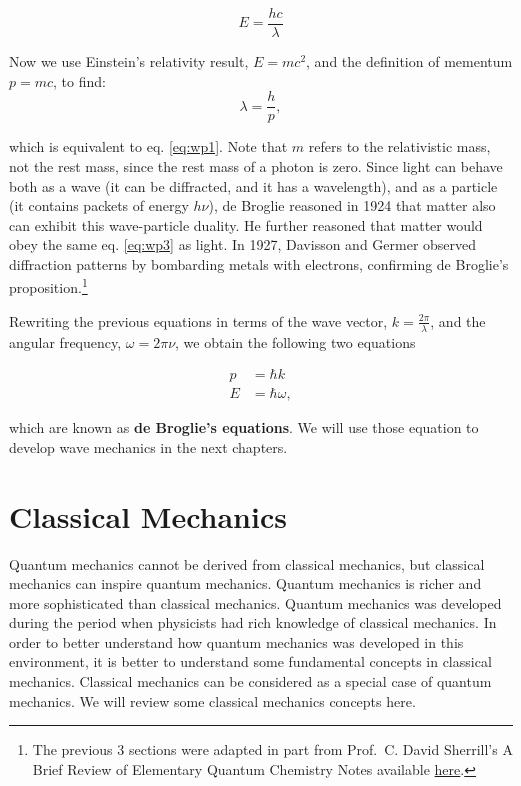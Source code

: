 \documentclass[
  9pt,
]{extbook}
\theoremstyle{definition}
\theoremstyle{definition}
\theoremstyle{definition}
\theoremstyle{remark}
\begin{document}
\begin{equation}
E = \frac{h c}{\lambda}
\label{eq:wp2}
\end{equation}

Now we use Einstein's relativity result, \(E = m c^2\), and the definition of mementum \(p=mc\), to find:
\begin{equation}
\lambda = \frac{h}{p},
\label{eq:wp3}
\end{equation}

which is equivalent to eq. \eqref{eq:wp1}. Note that \(m\) refers to the relativistic mass, not the rest mass, since the rest mass of a photon is zero. Since light can behave both as a wave (it can be diffracted, and it has a wavelength), and as a particle (it contains packets of energy \(h \nu\)), de Broglie reasoned in 1924 that matter also can exhibit this wave-particle duality. He further reasoned that matter would obey the same eq. \eqref{eq:wp3} as light. In 1927, Davisson and Germer observed diffraction patterns by bombarding metals with electrons, confirming de Broglie's proposition.\footnote{The previous 3 sections were adapted in part from Prof.~C. David Sherrill's A Brief Review of Elementary Quantum Chemistry Notes available \href{http://vergil.chemistry.gatech.edu/notes/quantrev/node1.html}{here}.}

Rewriting the previous equations in terms of the wave vector, \(k=\frac{2\pi}{\lambda}\), and the angular frequency, \(\omega=2\pi\nu\), we obtain the following two equations

\begin{equation}
\begin{aligned}
p &= \hbar k \\
E &= \hbar \omega,
\end{aligned}
\label{eq:wp1b}
\end{equation}

which are known as \textbf{de Broglie's equations}. We will use those equation to develop wave mechanics in the next chapters.

\hypertarget{Classical}{%
\chapter{Classical Mechanics}\label{Classical}}

Quantum mechanics cannot be derived from classical mechanics, but classical mechanics can inspire quantum mechanics. Quantum mechanics is richer and more sophisticated than classical mechanics. Quantum mechanics was developed during the period when physicists had rich knowledge of classical mechanics. In order to better understand how quantum mechanics was developed in this environment, it is better to understand some fundamental concepts in classical mechanics. Classical mechanics can be considered as a special case of quantum mechanics. We will review some classical mechanics concepts here.
\end{document}
